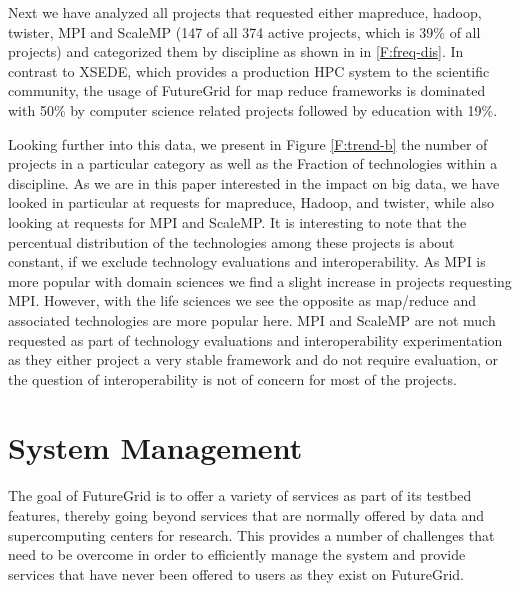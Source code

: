 \documentclass{article}
\newcommand{\FILE}[1]{}
\begin{document}
Next we have analyzed all projects that requested either mapreduce, hadoop, twister, MPI and ScaleMP (147 of all 374 active projects, which is 39\% of all projects) and categorized them by discipline as shown in in \ref{F:freq-dis}. In contrast to XSEDE, which provides a production HPC system to the scientific community, the usage of FutureGrid for map reduce frameworks is dominated with 50\% by computer science related projects followed by education with 19\%.




Looking further into this data, we present in Figure \ref{F:trend-b} the number of projects in a particular category as well as the Fraction of technologies within a discipline. As we are in this paper interested in the impact on big data, we have looked in particular at requests for mapreduce, Hadoop, and twister, while also looking at requests for MPI and ScaleMP. It is interesting to note that the percentual distribution of the technologies among these projects is about constant, if we exclude technology evaluations and interoperability. As MPI is more popular with domain sciences we find a slight increase in projects requesting MPI. However, with the life sciences we see the opposite as map/reduce and associated technologies are more popular here. MPI and ScaleMP are not much requested as part of technology evaluations and interoperability experimentation as they either project a very stable framework and do not require evaluation, or the question of interoperability is not of concern for most of the projects.  












\FILE{devops.tex}


\section{System Management}\label{S:devops}


The goal of FutureGrid is to offer a variety of services as part of its testbed features, thereby going beyond services that are normally offered by data and supercomputing centers for research. This provides a number of challenges that need to be overcome in order to efficiently manage the system and provide services that have never been offered to users as they exist on FutureGrid.
\end{document}
